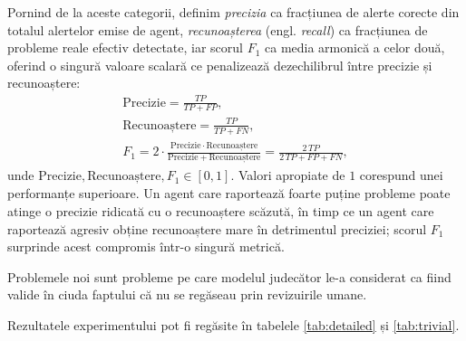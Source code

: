 \documentclass[12pt, a4paper, oneside, romanian]{teza-upb}
\begin{document}
    Pornind de la aceste categorii, definim \textit{precizia} ca fracțiunea de alerte corecte din totalul alertelor emise de agent, \textit{recunoașterea} (engl. \textit{recall}) ca fracțiunea de probleme reale efectiv detectate, iar scorul $F_1$ ca media armonică a celor două, oferind o singură valoare scalară ce penalizează dezechilibrul între precizie și recunoaștere:
    \begin{equation}
      \begin{gathered}
        \mathrm{Precizie} = \frac{\mathit{TP}}{\mathit{TP} + \mathit{FP}}, \\
        \mathrm{Recunoaștere} = \frac{\mathit{TP}}{\mathit{TP} + \mathit{FN}}, \\
        F_1 = 2 \cdot \frac{\mathrm{Precizie} \cdot \mathrm{Recunoaștere}}{\mathrm{Precizie} + \mathrm{Recunoaștere}} = \frac{2\,\mathit{TP}}{2\,\mathit{TP} + \mathit{FP} + \mathit{FN}},
      \end{gathered}
      \label{eq:precision-recall-f1}
    \end{equation}
    unde $\mathrm{Precizie}, \mathrm{Recunoaștere}, F_1 \in [0, 1]$. Valori apropiate de $1$ corespund unei performanțe superioare. Un agent care raportează foarte puține probleme poate atinge o precizie ridicată cu o recunoaștere scăzută, în timp ce un agent care raportează agresiv obține recunoaștere mare în detrimentul preciziei; scorul $F_1$ surprinde acest compromis într-o singură metrică.

    Problemele noi sunt probleme pe care modelul judecător le-a considerat ca fiind valide în ciuda faptului că nu se regăseau prin revizuirile umane.

    Rezultatele experimentului pot fi regăsite în tabelele \ref{tab:detailed} și \ref{tab:trivial}.
\end{document}
